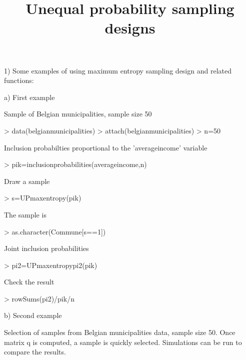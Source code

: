 \documentclass[a4paper]{article}
\title{Unequal probability sampling designs}
\author{}
\begin{document}
\maketitle

1) Some examples of using maximum entropy sampling design and related functions:

a) First example

Sample of Belgian municipalities, sample size 50

\begin{Schunk}
\begin{Sinput}
> data(belgianmunicipalities)
> attach(belgianmunicipalities)
> n=50
\end{Sinput}
\end{Schunk}
Inclusion probabilties proportional to the 'averageincome' variable

\begin{Schunk}
\begin{Sinput}
> pik=inclusionprobabilities(averageincome,n)
\end{Sinput}
\end{Schunk}
Draw a sample

\begin{Schunk}
\begin{Sinput}
> s=UPmaxentropy(pik)
\end{Sinput}
\end{Schunk}
The sample is

\begin{Schunk}
\begin{Sinput}
> as.character(Commune[s==1])
\end{Sinput}
\end{Schunk}
Joint inclusion probabilities

\begin{Schunk}
\begin{Sinput}
> pi2=UPmaxentropypi2(pik)
\end{Sinput}
\end{Schunk}
Check the result

\begin{Schunk}
\begin{Sinput}
> rowSums(pi2)/pik/n
\end{Sinput}
\end{Schunk}
b) Second example

Selection of samples from Belgian municipalities data, sample size 50.
Once matrix q is computed, a sample is quickly selected.
Simulations can be run to compare the results.
 
\end{document}
